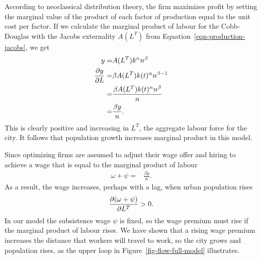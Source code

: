 According to \gls{neoclassical distribution theory}, the firm maximizes profit by setting the marginal value of the product of each \gls{factor of production} equal to the unit cost per factor. If we calculate the marginal product of labour for the Cobb-Douglas with the Jacobs externality $A(L^T)$ from Equation~\ref{eqn-production-jacobs}, we get 
\begin{align}\label{eqn-model-MPL}
y              =&  A(L^T) k^\alpha n^\beta \nonumber\\ 
\frac{\partial y}{\partial L}     =&\beta A(L^T) k(t)^\alpha n^{\beta-1} \nonumber\\
                =&\frac{\beta A(L^T) k(t)^\alpha n^\beta}{n} \nonumber\\
                =& \frac{\beta y}{n}.
\end{align}
This is clearly positive and increasing in $L^T$, the aggregate labour force for the city.  It follows that population growth increases marginal product in this model. 


Since optimizing firms are assumed to adjust their wage offer and hiring to achieve a wage that is equal to the marginal product of labour 
\begin{align}\label{eqn-model-MPL-w}
             \omega + \psi   =& \frac{\beta y}{n}.
\end{align}
As a result, the wage increases, perhaps with a lag, when urban population  rises 
\begin{equation}
 \frac{\partial (\omega + \psi)}{\partial L^T} >0.
\label{eqn-wage-population}
\end{equation}
In our model the subsistence wage $\psi$ is fixed, so the wage premium must rise if the marginal product of labour rises.  We have shown that a rising wage premium increases the distance that workers will travel to work, so the city grows and population rises, as the upper loop in Figure~\ref{fig-flow-full-model} illustrates. 

 

